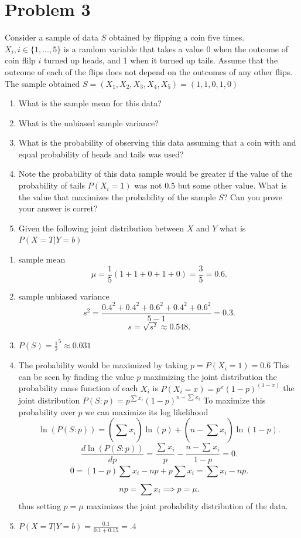 \documentclass[11pt]{article}
\newcommand{\solution}[1]{{{\color{blue}{\bf Solution:} {#1}}}}
\begin{document}
\section{Problem 3}
Consider a sample of data $S$ obtained by flipping a coin five times. $X_i, i \in \{1,...,5\}$ is a random 
variable that takes a value 0 when the outcome of coin flilp  $i$ turned up heads, and 1 when it turned up tails.
Assume that the outcome of each of the flips does not depend on the outcomes of any other flips.
The sample obtained $S = (X_1,X_2,X_3,X_4,X_5) = (1,1,0,1,0)$
\begin{enumerate}
    \item What is the sample mean for this data?
    \item What is the unbiased sample variance?
    \item What is the probability of observing this data assuming that a coin with
        and equal probability of heads and tails was used?
    \item Note the probability of this data sample would be greater if the value 
        of the probability of tails $P(X_i = 1)$ was not $0.5$ but some other value. What is the value that maximizes the
        probability of the sample $S$? Can you prove your answer is corret?
    \item Given the following joint distribution between $X$ and $Y$ what is $P(X=T|Y=b)$
\end{enumerate}
\solution{
    \begin{enumerate}
        \item sample mean
            \[
            \mu =\frac{1}{5}(1 + 1 + 0 + 1 + 0) = \frac{3}{5} = 0.6
            .\] 
        \item sample unbiased variance
            \[
            s^2 = \frac{0.4^2 + 0.4^2 + 0.6^2 + 0.4^2 + 0.6^2}{5-1} = 0.3
            .\] 
            \[
            s = \sqrt{s^2} \approx 0.548
            .\] 
        \item 
            $P(S) = \frac{1}{2}^{5} \approx 0.031$ 
        \item 
            The probability would be maximized by taking $p =P(X_i = 1) = 0.6$
            This can be seen by finding the value  $p$ maximizing the joint distribution
            the probability mass function of each $X_i$ is $P(X_i = x) = p^{x}(1-p)^{(1-x)}$
            the joint distribution $P(S:p) = p^{\sum_{}^{}x_i}(1-p)^{n-\sum_{}^{}x_i}$ 
            To maximize this probability over $p$ we can maximize its log likelihood
            \[
            \ln(P(S:p)) = (\sum_{}^{}x_i)\ln(p) + (n-\sum_{}^{}x_i)\ln(1-p)
            .\] 
            \[
                \frac{d\ln(P(S:p))}{dp} = \frac{\sum_{}^{}x_i}{p}-\frac{n-\sum_{}^{}x_i}{1-p} = 0
            .\] 
            \[
            0 = (1-p)\sum_{}^{}x_i - np + p\sum_{}^{}x_i = \sum_{}^{}x_i -np
            .\]  
            \[
            np = \sum_{}^{}x_i \implies p = \mu
            .\] 
            thus setting  $p = \mu $ maximizes the joint probability distribution of the data.
        \item 
            $P(X=T|Y=b) = \frac{0.1}{0.1+0.15} = .4$
    \end{enumerate}
}
\end{document}
